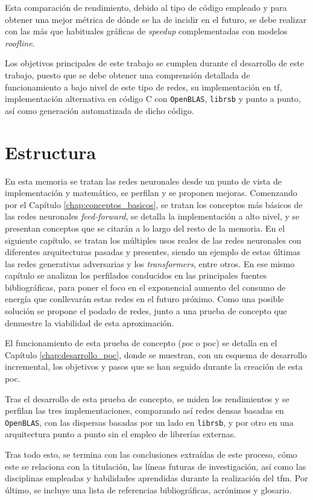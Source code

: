 Esta comparación de rendimiento, debido al tipo de código empleado y para obtener una mejor métrica de dónde se ha de incidir en el futuro, se debe realizar con las más que habituales gráficas de \textit{speedup} complementadas con modelos \textit{roofline}.

Los objetivos principales de este trabajo se cumplen durante el desarrollo de este trabajo, puesto que se debe obtener una comprensión detallada de funcionamiento a bajo nivel de este tipo de redes, su implementación en \acrlong{tf}, implementación alternativa en código C con \texttt{OpenBLAS}, \texttt{librsb} y punto a punto, así como generación automatizada de dicho código.

\section{Estructura}
\label{sec:estructura}
En esta memoria se tratan las redes neuronales desde un punto de vista de implementación y matemático, se perfilan y se proponen mejoras. Comenzando por el Capítulo \ref{chap:conceptos_basicos}, se tratan los conceptos más básicos de las redes neuronales \textit{feed-forward}, se detalla la implementación a alto nivel, y se presentan conceptos que se citarán a lo largo del resto de la memoria. En el siguiente capítulo, se tratan los múltiples usos reales de las redes neuronales con diferentes arquitecturas pasadas y presentes, siendo un ejemplo de estas últimas las redes generativas adversarias y los \textit{transformers}, entre otros. En ese mismo capítulo se analizan los perfilados conducidos en las principales fuentes bibliográficas, para poner el foco en el exponencial aumento del consumo de energía que conllevarán estas redes en el futuro próximo. Como una posible solución se propone el podado de redes, junto a una prueba de concepto que demuestre la viabilidad de esta aproximación.

El funcionamiento de esta prueba de concepto (\textit{\acrlong{poc}} o \acrshort{poc}) se detalla en el Capítulo \ref{chap:desarrollo_poc}, donde se muestran, con un esquema de desarrollo incremental, los objetivos y pasos que se han seguido durante la creación de esta \acrshort{poc}.

Tras el desarrollo de esta prueba de concepto, se miden los rendimientos y se perfilan las tres implementaciones, comparando así redes densas basadas en \texttt{OpenBLAS}, con las dispersas basadas por un lado en \texttt{librsb}, y por otro en una arquitectura punto a punto sin el empleo de librerías externas.

Tras todo esto, se termina con las conclusiones extraídas de este proceso, cómo este se relaciona con la titulación, las líneas futuras de investigación, así como las disciplinas empleadas y habilidades aprendidas durante la realización del \acrshort{tfm}. Por último, se incluye una lista de referencias bibliográficas, acrónimos y glosario.
